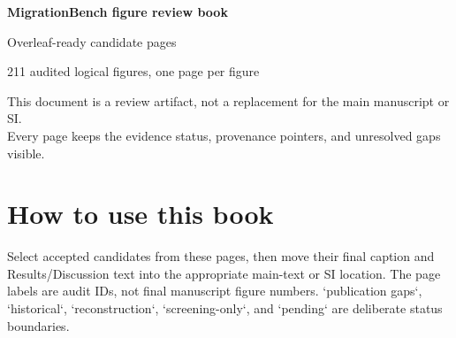 \documentclass[10pt]{article}
\begin{document}
\begin{titlepage}
\centering
\vspace*{1.0in}
{\LARGE\bfseries MigrationBench figure review book\par}
\vspace{0.25in}
{\large Overleaf-ready candidate pages\par}
\vspace{0.5in}
{\large 211 audited logical figures, one page per figure\par}
\vfill
This document is a review artifact, not a replacement for the main manuscript or SI.\\
Every page keeps the evidence status, provenance pointers, and unresolved gaps visible.
\end{titlepage}
\tableofcontents
\clearpage
\section*{How to use this book}
Select accepted candidates from these pages, then move their final caption and Results/Discussion text into the appropriate main-text or SI location. The page labels are audit IDs, not final manuscript figure numbers. `publication gaps`, `historical`, `reconstruction`, `screening-only`, and `pending` are deliberate status boundaries.
\clearpage
\clearpage
\end{document}
